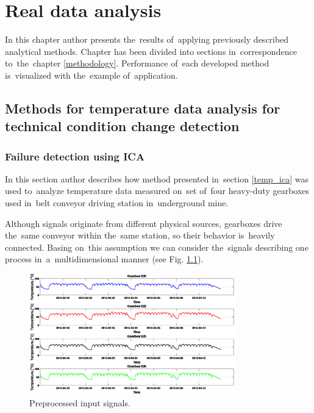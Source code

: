 \chapter{Real data analysis}

In this chapter author presents the~results of~applying previously described analytical methods. Chapter has been divided into sections in~correspondence to~the~chapter \ref{methodology}. Performance of~each developed method is~visualized with the~example of~application.





\section{Methods for temperature data analysis for technical condition change detection}\label{results_temps}
\subsection{Failure detection using ICA}\label{result_ica}

In this section author describes how method presented in~section \ref{temp_ica} was used to~analyze temperature data measured on~set of~four heavy-duty gearboxes used in~belt conveyor driving station in~underground mine.

Although signals originate from different physical sources, gearboxes drive the~same conveyor within the~same station, so their behavior is~heavily connected. Basing on~this assumption we can consider the~signals describing one process in~a~multidimensional manner (see Fig. \ref{fig: ica_raw}). 

\begin{figure}[ht!]
\centering
\includegraphics[width = 0.8\textwidth]{wykresy/ica_raw.png}
\caption{Preprocessed input signals.}
\label{fig: ica_raw}
\end{figure}

